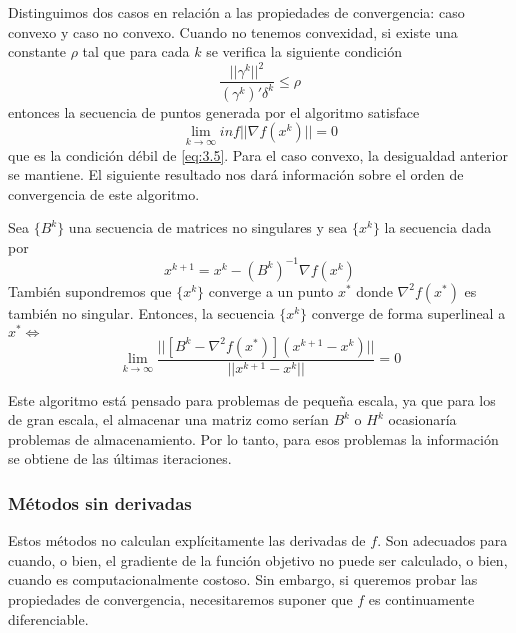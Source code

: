Distinguimos dos casos en relación a las propiedades de convergencia: caso convexo y caso no convexo. 
Cuando no tenemos convexidad, si existe una constante $\rho$ tal que para cada $k$ se verifica la siguiente condición
\begin{equation}
\dfrac{||\gamma^k||^2}{(\gamma^k)'\delta^k} \leq \rho
\label{eq:4.32}
\end{equation}
entonces la secuencia de puntos generada por el algoritmo satisface
\begin{equation*}
\lim_{k\xrightarrow{}{}\infty} inf||\nabla f(x^k)|| = 0
\end{equation*}
que es la condición débil de \ref{eq:3.5}. 
Para el caso convexo, la desigualdad anterior se mantiene. 
El siguiente resultado nos dará información sobre el orden de convergencia de este algoritmo. 

\begin{proposicion}
Sea $\{B^k\}$ una secuencia de matrices no singulares y sea $\{x^k\}$ la secuencia dada por
\begin{equation*}
x^{k+1} = x^k - (B^k)^{-1}\nabla f(x^k)
\end{equation*}
También supondremos que $\{x^k\}$ converge a un punto $x^*$ donde $\nabla^2 f(x^*)$ es también no singular. 
Entonces, la secuencia $\{x^k\}$ converge de forma superlineal a $x^* \Leftrightarrow$
\begin{equation*}
\lim_{k\xrightarrow{}{}\infty}\dfrac{||[B^k-\nabla^2f(x^*)](x^{k+1}-x^k)||}{||x^{k+1}-x^k||} = 0
\end{equation*}
\end{proposicion}

Este algoritmo está pensado para problemas de pequeña escala, ya que para los de gran escala, el almacenar una matriz como serían $B^k$ o $H^k$ ocasionaría problemas de almacenamiento. 
Por lo tanto, para esos problemas la información se obtiene de las últimas iteraciones. 

\subsubsection{Métodos sin derivadas}

Estos métodos no calculan explícitamente las derivadas de $f$. 
Son adecuados para cuando, o bien, el gradiente de la función objetivo no puede ser calculado, o bien, cuando es computacionalmente costoso. 
Sin embargo, si queremos probar las propiedades de convergencia, necesitaremos suponer que $f$ es continuamente diferenciable. 

